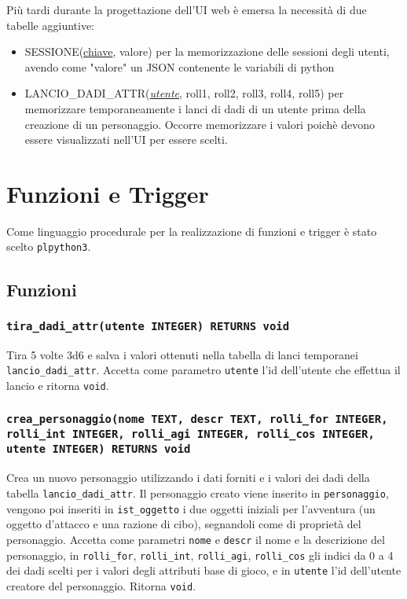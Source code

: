 \documentclass[10pt,a4paper]{article}
\begin{document}
Più tardi durante la progettazione dell'UI web è emersa la necessità di due tabelle aggiuntive:
\begin{itemize}[leftmargin=*]
  \item[] SESSIONE(\underline{chiave}, valore) per la memorizzazione delle sessioni degli utenti, avendo come "valore" un JSON contenente le variabili di python
  \item[] LANCIO\_DADI\_ATTR(\underline{\textit{utente}}, roll1, roll2, roll3, roll4, roll5) per memorizzare temporaneamente i lanci di dadi di un utente prima della creazione di un personaggio. Occorre memorizzare i valori poichè devono essere visualizzati nell'UI per essere scelti.
\end{itemize}

\section{Funzioni e Trigger}
Come linguaggio procedurale per la realizzazione di funzioni e trigger è stato scelto \texttt{plpython3}.

\subsection{Funzioni}

\subsubsection{\texttt{tira\_dadi\_attr(utente INTEGER) RETURNS void}}
Tira 5 volte 3d6 e salva i valori ottenuti nella tabella di lanci temporanei \texttt{lancio\_dadi\_attr}. Accetta come parametro \texttt{utente} l'id dell'utente che effettua il lancio e ritorna \texttt{void}.

\subsubsection{\texttt{crea\_personaggio(nome TEXT, descr TEXT, rolli\_for INTEGER, rolli\_int INTEGER, rolli\_agi INTEGER, rolli\_cos INTEGER, utente INTEGER) RETURNS void}}
Crea un nuovo personaggio utilizzando i dati forniti e i valori dei dadi della tabella \texttt{lancio\_dadi\_attr}. Il personaggio creato viene inserito in \texttt{personaggio}, vengono poi inseriti in \texttt{ist\_oggetto} i due oggetti iniziali per l'avventura (un oggetto d'attacco e una razione di cibo), segnandoli come di proprietà del personaggio. Accetta come parametri \texttt{nome} e \texttt{descr} il nome e la descrizione del personaggio, in \texttt{rolli\_for}, \texttt{rolli\_int}, \texttt{rolli\_agi}, \texttt{rolli\_cos} gli indici da 0 a 4 dei dadi scelti per i valori degli attributi base di gioco, e in \texttt{utente} l'id dell'utente creatore del personaggio. Ritorna \texttt{void}.
\end{document}
